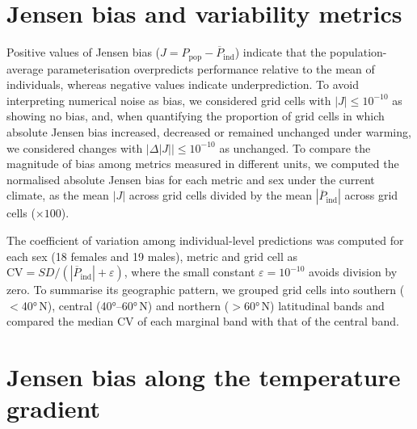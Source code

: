 \documentclass[12pt]{article}
\begin{document}
\section{Jensen bias and variability metrics}\label{sm:metrics}

Positive values of Jensen bias ($J = P_{\mathrm{pop}} - \overline{P}_{\mathrm{ind}}$) indicate that the population-average parameterisation overpredicts performance relative to the mean of individuals, whereas negative values indicate underprediction. To avoid interpreting numerical noise as bias, we considered grid cells with $|J| \leq 10^{-10}$ as showing no bias, and, when quantifying the proportion of grid cells in which absolute Jensen bias increased, decreased or remained unchanged under warming, we considered changes with $|\Delta|J|| \leq 10^{-10}$ as unchanged. To compare the magnitude of bias among metrics measured in different units, we computed the normalised absolute Jensen bias for each metric and sex under the current climate, as the mean $|J|$ across grid cells divided by the mean $|\overline{P}_{\mathrm{ind}}|$ across grid cells ($\times 100$).

The coefficient of variation among individual-level predictions was computed for each sex (18 females and 19 males), metric and grid cell as $\mathrm{CV} = SD / (|\overline{P}_{\mathrm{ind}}| + \varepsilon)$, where the small constant $\varepsilon = 10^{-10}$ avoids division by zero. To summarise its geographic pattern, we grouped grid cells into southern ($<$\ang{40}\,N), central (\ang{40}--\ang{60}\,N) and northern ($>$\ang{60}\,N) latitudinal bands and compared the median CV of each marginal band with that of the central band.

\section{Jensen bias along the temperature gradient}\label{sm:gam}
\end{document}
